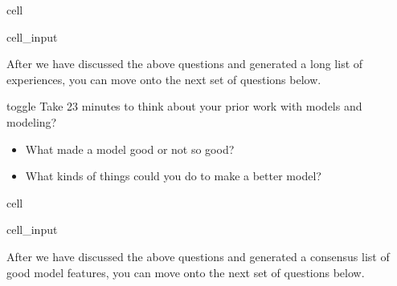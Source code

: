 \documentclass[letterpaper,10pt,english]{jupyterBook}
\begin{document}
\begin{sphinxuseclass}{cell}\begin{sphinxVerbatimInput}

\begin{sphinxuseclass}{cell_input}
\begin{sphinxVerbatim}[commandchars=\\\{\}]

\end{sphinxVerbatim}

\end{sphinxuseclass}\end{sphinxVerbatimInput}

\end{sphinxuseclass}
\sphinxAtStartPar
After we have discussed the above questions and generated a long list of experiences, you can move onto the next set of questions below.

\begin{sphinxuseclass}{toggle}
\sphinxAtStartPar
Take 2\sphinxhyphen{}3 minutes to think about your prior work with models and modeling?
\begin{itemize}
\item {} 
\sphinxAtStartPar
What made a model good or not so good?

\item {} 
\sphinxAtStartPar
What kinds of things could you do to make a better model?

\end{itemize}

\end{sphinxuseclass}
\begin{sphinxuseclass}{cell}\begin{sphinxVerbatimInput}

\begin{sphinxuseclass}{cell_input}
\begin{sphinxVerbatim}[commandchars=\\\{\}]

\end{sphinxVerbatim}

\end{sphinxuseclass}\end{sphinxVerbatimInput}

\end{sphinxuseclass}
\sphinxAtStartPar
After we have discussed the above questions and generated a consensus list of good model features, you can move onto the next set of questions below.
\end{document}
